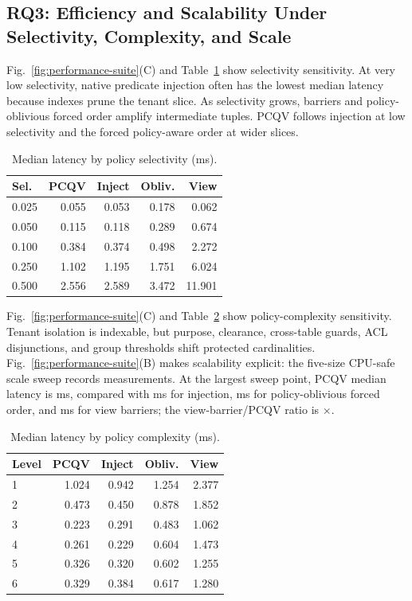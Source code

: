 \documentclass[conference]{IEEEtran}
\newcommand{\pcqv}{PCQV}
\begin{document}
\subsection{RQ3: Efficiency and Scalability Under Selectivity, Complexity, and Scale}
Fig.~\ref{fig:performance-suite}(C) and Table~\ref{tab:selectivitytable} show selectivity sensitivity. At very low selectivity, native predicate injection often has the lowest median latency because indexes prune the tenant slice. As selectivity grows, barriers and policy-oblivious forced order amplify intermediate tuples. \pcqv{} follows injection at low selectivity and the forced policy-aware order at wider slices.


\begin{table}[t]
\centering
\caption{Median latency by policy selectivity (ms).}
\label{tab:selectivitytable}
\begin{tabular}{lrrrr}
\toprule
Sel. & \pcqv{} & Inject & Obliv. & View \\
\midrule
0.025 & 0.055 & 0.053 & 0.178 & 0.062 \\
0.050 & 0.115 & 0.118 & 0.289 & 0.674 \\
0.100 & 0.384 & 0.374 & 0.498 & 2.272 \\
0.250 & 1.102 & 1.195 & 1.751 & 6.024 \\
0.500 & 2.556 & 2.589 & 3.472 & 11.901 \\
\bottomrule
\end{tabular}
\end{table}

Fig.~\ref{fig:performance-suite}(C) and Table~\ref{tab:complexitytable} show policy-complexity sensitivity. Tenant isolation is indexable, but purpose, clearance, cross-table guards, ACL disjunctions, and group thresholds shift protected cardinalities. Fig.~\ref{fig:performance-suite}(B) makes scalability explicit: the five-size CPU-safe scale sweep records \ScaleSweepRows{} measurements. At the largest sweep point, \pcqv{} median latency is \ScaleLargestPcqvMs{} ms, compared with \ScaleLargestInjectionMs{} ms for injection, \ScaleLargestObliviousMs{} ms for policy-oblivious forced order, and \ScaleLargestViewMs{} ms for view barriers; the view-barrier/\pcqv{} ratio is \ScaleLargestViewSpeedup{}$\times$.


\begin{table}[t]
\centering
\caption{Median latency by policy complexity (ms).}
\label{tab:complexitytable}
\begin{tabular}{lrrrr}
\toprule
Level & \pcqv{} & Inject & Obliv. & View \\
\midrule
1 & 1.024 & 0.942 & 1.254 & 2.377 \\
2 & 0.473 & 0.450 & 0.878 & 1.852 \\
3 & 0.223 & 0.291 & 0.483 & 1.062 \\
4 & 0.261 & 0.229 & 0.604 & 1.473 \\
5 & 0.326 & 0.320 & 0.602 & 1.255 \\
6 & 0.329 & 0.384 & 0.617 & 1.280 \\
\bottomrule
\end{tabular}
\end{table}
\end{document}
